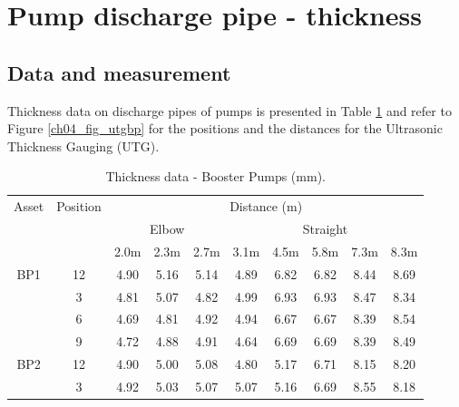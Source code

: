 %
\section{Pump discharge pipe - thickness} \label{ch04mech01}
\subsection{Data and measurement}
Thickness data on discharge pipes of pumps is presented in Table \ref{ch04_tbl_thickness02} and refer to Figure \ref{ch04_fig_utgbp} for the positions and the distances for the Ultrasonic Thickness Gauging (UTG).


\begin{table}[h]
	\caption{Thickness data - Booster Pumps (mm).}
	\label{ch04_tbl_thickness02}
	{\footnotesize
\begin{tabular}{l|c|c|c|c|l|l|l|l|l}
\hline
\multicolumn{1}{c|}{Asset} & Position & \multicolumn{8}{c}{Distance (m)} \\ 
\cline{3-10}
\multicolumn{1}{c|}{} &  & \multicolumn{3}{c|}{Elbow} & \multicolumn{5}{c}{Straight} \\ 
\cline{3-10}
\multicolumn{1}{c|}{} &  & 2.0m & 2.3m & 2.7m & \multicolumn{1}{c|}{3.1m} & \multicolumn{1}{c|}{4.5m} & \multicolumn{1}{c|}{5.8m} & \multicolumn{1}{c|}{7.3m} & \multicolumn{1}{c}{8.3m} \\ 
\hline
\multicolumn{1}{c|}{BP1} & 12 & 4.90 & 5.16 & 5.14 & \multicolumn{1}{c|}{4.89} & \multicolumn{1}{c|}{6.82} & \multicolumn{1}{c|}{6.82} & \multicolumn{1}{c|}{8.44} & \multicolumn{1}{c}{8.69} \\ 
\multicolumn{1}{c|}{} & 3 & 4.81 & 5.07 & 4.82 & \multicolumn{1}{c|}{4.99} & \multicolumn{1}{c|}{6.93} & \multicolumn{1}{c|}{6.93} & \multicolumn{1}{c|}{8.47} & \multicolumn{1}{c}{8.34} \\ 
\multicolumn{1}{c|}{} & 6 & 4.69 & 4.81 & 4.92 & \multicolumn{1}{c|}{4.94} & \multicolumn{1}{c|}{6.67} & \multicolumn{1}{c|}{6.67} & \multicolumn{1}{c|}{8.39} & \multicolumn{1}{c}{8.54} \\ 
\multicolumn{1}{c|}{} & 9 & 4.72 & 4.88 & 4.91 & \multicolumn{1}{c|}{4.64} & \multicolumn{1}{c|}{6.69} & \multicolumn{1}{c|}{6.69} & \multicolumn{1}{c|}{8.39} & \multicolumn{1}{c}{8.49} \\ 
\hline
\multicolumn{1}{c|}{BP2} & 12 & 4.90 & 5.00 & 5.08 & \multicolumn{1}{c|}{4.80} & \multicolumn{1}{c|}{5.17} & \multicolumn{1}{c|}{6.71} & \multicolumn{1}{c|}{8.15} & \multicolumn{1}{c}{8.20} \\ 
\multicolumn{1}{c|}{} & 3 & 4.92 & 5.03 & 5.07 & \multicolumn{1}{c|}{5.07} & \multicolumn{1}{c|}{5.16} & \multicolumn{1}{c|}{6.69} & \multicolumn{1}{c|}{8.55} & \multicolumn{1}{c}{8.18} \\ 

\end{tabular}}
\end{table}
